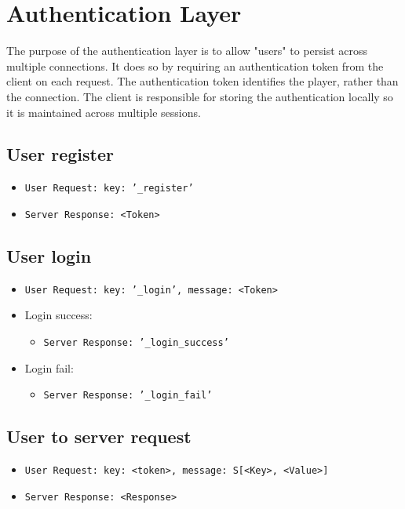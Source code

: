 \documentclass{article}
\begin{document}
\section{Authentication Layer}

The purpose of the authentication layer is to allow "users" to persist across multiple connections. It does so by requiring an authentication token from the client on each request. The authentication token identifies the player, rather than the connection. The client is responsible for storing the authentication locally so it is maintained across multiple sessions.

\subsection*{User register}

\begin{itemize}
    \item \texttt{User Request: key: '\_register'}
    \item \texttt{Server Response: <Token>}
\end{itemize}

\subsection*{User login}
\begin{itemize}
    \item \texttt{User Request: key: '\_login', message: <Token>}
    \item Login success:
    \begin{itemize}
        \item \texttt{Server Response: '\_login\_success'}
    \end{itemize}
    \item Login fail:
    \begin{itemize}
        \item \texttt{Server Response: '\_login\_fail'}
    \end{itemize}
\end{itemize}

\subsection*{User to server request}
\begin{itemize}
    \item \texttt{User Request: key: <token>, message: S[<Key>, <Value>]}
    \item \texttt{Server Response: <Response>}
\end{itemize}
\end{document}
